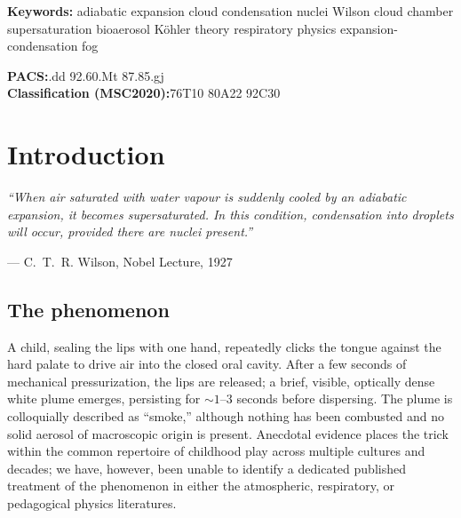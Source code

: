 \documentclass[11pt,a4paper]{article}
\theoremstyle{definition}
\theoremstyle{plain}
\begin{document}
\begin{center}
\begin{minipage}{0.92\textwidth}
\vspace{0.5em}
\noindent\textbf{Keywords:}\quad
adiabatic expansion \textperiodcentered{} cloud condensation nuclei \textperiodcentered{} Wilson cloud chamber \textperiodcentered{} supersaturation \textperiodcentered{} bioaerosol \textperiodcentered{} Köhler theory \textperiodcentered{} respiratory physics \textperiodcentered{} expansion-condensation fog

\vspace{0.4em}
\noindent\textbf{PACS:}.dd \textperiodcentered{} 92.60.Mt \textperiodcentered{} 87.85.gj\\
\noindent\textbf{Classification (MSC2020):}\quad 76T10 \textperiodcentered{} 80A22 \textperiodcentered{} 92C30
\end{minipage}
\end{center}

\vspace{0.6em}
\noindent\hrulefill
\vspace{0.6em}

\tableofcontents
\vspace{1em}
\noindent\hrulefill

\newpage

\section{Introduction}

\epigraph{\itshape ``When air saturated with water vapour is suddenly cooled by an adiabatic expansion, it becomes supersaturated. In this condition, condensation into droplets will occur, provided there are nuclei present.''}{--- C.~T.~R. Wilson, Nobel Lecture, 1927}

\subsection{The phenomenon}
\label{sec:phenomenon}

A child, sealing the lips with one hand, repeatedly clicks the tongue against the hard palate to drive air into the closed oral cavity. After a few seconds of mechanical pressurization, the lips are released; a brief, visible, optically dense white plume emerges, persisting for $\sim\!1\text{--}3$ seconds before dispersing. The plume is colloquially described as ``smoke,'' although nothing has been combusted and no solid aerosol of macroscopic origin is present. Anecdotal evidence places the trick within the common repertoire of childhood play across multiple cultures and decades; we have, however, been unable to identify a dedicated published treatment of the phenomenon in either the atmospheric, respiratory, or pedagogical physics literatures.
\end{document}
